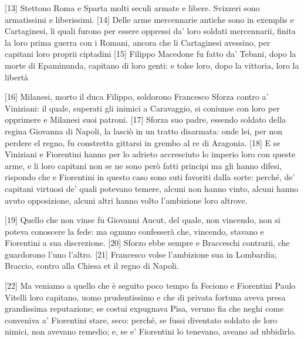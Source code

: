 {[}13{]} Stettono Roma e Sparta molti seculi armate e libere. Svizzeri
sono armatissimi e liberissimi. {[}14{]} Delle arme mercennarie antiche
sono in exemplis e Cartaginesi, li quali furono per essere oppressi da'
loro soldati mercennarii, finita la loro prima guerra con i Romani,
ancora che li Cartaginesi avessino, per capitani loro proprii ciptadini
{[}15{]} Filippo Macedone fu fatto da' Tebani, dopo la morte di
Epaminunda, capitano di loro genti: e tolse loro, dopo la vittoria, loro
la libertà

{[}16{]} Milanesi, morto il duca Filippo, soldorono Francesco Sforza
contro a' Viniziani: il quale, superati gli inimici a Caravaggio, si
coniunse con loro per opprimere e Milanesi suoi patroni. {[}17{]} Sforza
suo padre, essendo soldato della regina Giovanna di Napoli, la lasciò in
un tratto disarmata: onde lei, per non perdere el regno, fu constretta
gittarsi in grembo al re di Aragonia. {[}18{]} E se Viniziani e
Fiorentini hanno per lo adrieto accresciuto lo imperio loro con queste
arme, e li loro capitani non se ne sono però fatti principi ma gli hanno
difesi, rispondo che e Fiorentini in questo caso sono suti favoriti
dalla sorte: perché, de' capitani virtuosi de' quali potevano temere,
alcuni non hanno vinto, alcuni hanno avuto opposizione, alcuni altri
hanno volto l'ambizione loro altrove.

{[}19{]} Quello che non vinse fu Giovanni Aucut, del quale, non
vincendo, non si poteva conoscere la fede: ma ognuno confesserà che,
vincendo, stavano e Fiorentini a sua discrezione. {[}20{]} Sforzo ebbe
sempre e Bracceschi contrarii, che guardorono l'uno l'altro. {[}21{]}
Francesco volse l'ambizione sua in Lombardia; Braccio, contro alla
Chiesa et il regno di Napoli.

{[}22{]} Ma veniamo a quello che è seguito poco tempo fa Feciono e
Fiorentini Paulo Vitelli loro capitano, uomo prudentissimo e che di
privata fortuna aveva presa grandissima reputazione; se costui expugnava
Pisa, veruno fia che neghi come conveniva a' Fiorentini stare, seco:
perché, se fussi diventato soldato de loro nimici, non avevano remedio;
e, se e' Fiorentini lo tenevano, aveano ad ubbidirlo.

